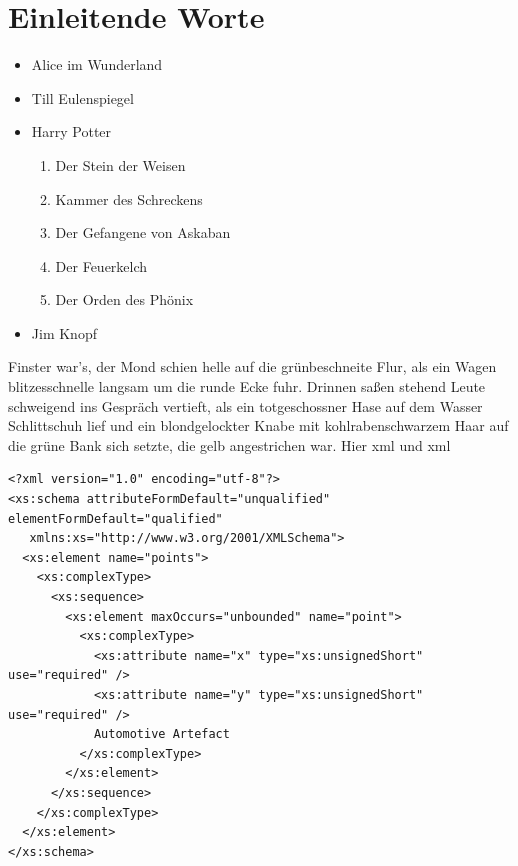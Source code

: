 
\section{Einleitende Worte}
\label{sec:einleitende Worte}
\begin{itemize}
\item Alice im Wunderland
\item Till Eulenspiegel
\item Harry Potter
\begin{enumerate}
\item Der Stein der Weisen
\item Kammer des Schreckens
\item Der Gefangene von Askaban
\item Der Feuerkelch
\item Der Orden des Phönix
\end{enumerate}
\item Jim Knopf
\end{itemize}
Finster war's, der Mond schien helle auf die grünbeschneite Flur, als
ein Wagen blitzesschnelle langsam um die runde Ecke fuhr. Drinnen
saßen stehend Leute schweigend ins Gespräch vertieft, als ein
totgeschossner Hase auf dem Wasser Schlittschuh lief und ein
blondgelockter Knabe mit kohlrabenschwarzem Haar auf die grüne Bank
sich setzte, die gelb angestrichen war.
Hier \gls{xml} und \gls{xml}
\lstset{language=XML}
\begin{lstlisting}[style=XML]
<?xml version="1.0" encoding="utf-8"?>
<xs:schema attributeFormDefault="unqualified" elementFormDefault="qualified"
   xmlns:xs="http://www.w3.org/2001/XMLSchema">
  <xs:element name="points">
    <xs:complexType>
      <xs:sequence>
        <xs:element maxOccurs="unbounded" name="point">
          <xs:complexType>
            <xs:attribute name="x" type="xs:unsignedShort" use="required" />
            <xs:attribute name="y" type="xs:unsignedShort" use="required" />
            Automotive Artefact
          </xs:complexType>
        </xs:element>
      </xs:sequence>
    </xs:complexType>
  </xs:element>
</xs:schema>
\end{lstlisting}


